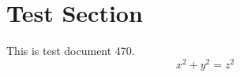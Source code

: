 \documentclass{article}
\begin{document}
\section{Test Section}
This is test document 470.
\begin{equation}
x^2 + y^2 = z^2
\end{equation}
\end{document}
